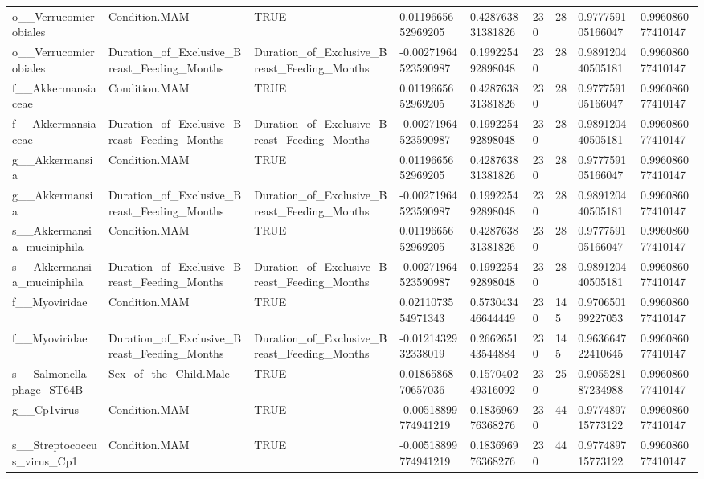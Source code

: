 \begin{longtable}{lllllllll}
o\_\_Verrucomicrobiales & Condition.MAM & TRUE & 0.0119665652969205 & 0.428763831381826 & 230 & 28 & 0.977759105166047 & 0.996086077410147 \\
o\_\_Verrucomicrobiales & Duration\_of\_Exclusive\_Breast\_Feeding\_Months & Duration\_of\_Exclusive\_Breast\_Feeding\_Months & -0.00271964523590987 & 0.199225492898048 & 230 & 28 & 0.989120440505181 & 0.996086077410147 \\
f\_\_Akkermansiaceae & Condition.MAM & TRUE & 0.0119665652969205 & 0.428763831381826 & 230 & 28 & 0.977759105166047 & 0.996086077410147 \\
f\_\_Akkermansiaceae & Duration\_of\_Exclusive\_Breast\_Feeding\_Months & Duration\_of\_Exclusive\_Breast\_Feeding\_Months & -0.00271964523590987 & 0.199225492898048 & 230 & 28 & 0.989120440505181 & 0.996086077410147 \\
g\_\_Akkermansia & Condition.MAM & TRUE & 0.0119665652969205 & 0.428763831381826 & 230 & 28 & 0.977759105166047 & 0.996086077410147 \\
g\_\_Akkermansia & Duration\_of\_Exclusive\_Breast\_Feeding\_Months & Duration\_of\_Exclusive\_Breast\_Feeding\_Months & -0.00271964523590987 & 0.199225492898048 & 230 & 28 & 0.989120440505181 & 0.996086077410147 \\
s\_\_Akkermansia\_muciniphila & Condition.MAM & TRUE & 0.0119665652969205 & 0.428763831381826 & 230 & 28 & 0.977759105166047 & 0.996086077410147 \\
s\_\_Akkermansia\_muciniphila & Duration\_of\_Exclusive\_Breast\_Feeding\_Months & Duration\_of\_Exclusive\_Breast\_Feeding\_Months & -0.00271964523590987 & 0.199225492898048 & 230 & 28 & 0.989120440505181 & 0.996086077410147 \\
f\_\_Myoviridae & Condition.MAM & TRUE & 0.0211073554971343 & 0.573043446644449 & 230 & 145 & 0.970650199227053 & 0.996086077410147 \\
f\_\_Myoviridae & Duration\_of\_Exclusive\_Breast\_Feeding\_Months & Duration\_of\_Exclusive\_Breast\_Feeding\_Months & -0.0121432932338019 & 0.266265143544884 & 230 & 145 & 0.963664722410645 & 0.996086077410147 \\
s\_\_Salmonella\_phage\_ST64B & Sex\_of\_the\_Child.Male & TRUE & 0.0186586870657036 & 0.157040249316092 & 230 & 25 & 0.905528187234988 & 0.996086077410147 \\
g\_\_Cp1virus & Condition.MAM & TRUE & -0.00518899774941219 & 0.183696976368276 & 230 & 44 & 0.977489715773122 & 0.996086077410147 \\
s\_\_Streptococcus\_virus\_Cp1 & Condition.MAM & TRUE & -0.00518899774941219 & 0.183696976368276 & 230 & 44 & 0.977489715773122 & 0.996086077410147 \\

\end{longtable}
